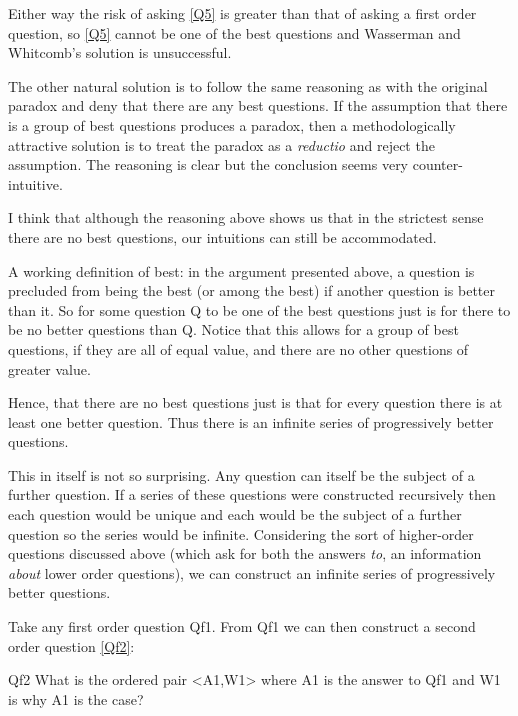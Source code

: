 Either way the risk of asking \ref{Q5} is greater than that of asking a first order question, so \ref{Q5} cannot be one of the best questions and Wasserman and Whitcomb's solution is unsuccessful.

The other natural solution is to follow the same reasoning as with the original paradox and deny that there are any best questions.
If the assumption that there is a group of best questions produces a paradox, then a methodologically attractive solution is to treat the paradox as a \textit{reductio} and reject the assumption.
The reasoning is clear but the conclusion seems very counter-intuitive.

I think that although the reasoning above shows us that in the strictest sense there are no best questions, our intuitions can still be accommodated.

A working definition of best: in the argument presented above, a question is precluded from being the best (or among the best) if another question is better than it.
So for some question Q to be one of the best questions just is for there to be no better questions than Q.
Notice that this allows for a group of best questions, if they are all of equal value, and there are no other questions of greater value.

Hence, that there are no best questions just is that for every question there is at least one better question.
Thus there is an infinite series of progressively better questions.

This in itself is not so surprising.
Any question can itself be the subject of a further question.
If a series of these questions were constructed recursively then each question would be unique and each would be the subject of a further question so the series would be infinite.
Considering the sort of higher-order questions discussed above (which ask for both the answers \emph{to}, an information \emph{about} lower order questions), we can construct an infinite series of progressively better questions.

Take any first order question Qf1.
From Qf1 we can then construct a second order question \ref{Qf2}:

	\begin{principle}{Qf2}\label{Qf2}
	What is the ordered pair <A1,W1> where A1 is the answer to Qf1 and W1 is why A1 is the case?
	\end{principle}

